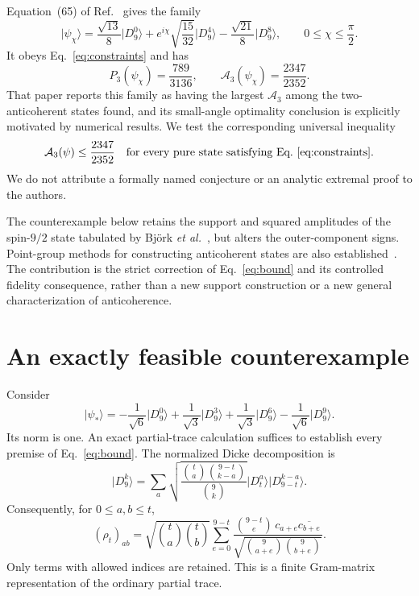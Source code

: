 \documentclass[aps,pra,reprint,onecolumn,notitlepage,longbibliography]{revtex4-2}
\newcommand{\ket}[1]{\lvert #1\rangle}
\newcommand{\A}{\mathcal A}
\begin{document}
Equation~(65) of Ref.~\cite{Martin2020} gives the family
\begin{equation}
 \ket{\psi_\chi}=\frac{\sqrt{13}}8\ket{D_9^0}
    +e^{i\chi}\sqrt{\frac{15}{32}}\ket{D_9^4}
    -\frac{\sqrt{21}}8\ket{D_9^8},
 \qquad 0\leq\chi\leq\frac\pi2.
 \label{eq:published}
\end{equation}
It obeys Eq.~\eqref{eq:constraints} and has
\begin{equation}
 P_3(\psi_\chi)=\frac{789}{3136},\qquad
 \A_3(\psi_\chi)=\frac{2347}{2352}.
 \label{eq:baseline}
\end{equation}
That paper reports this family as having the largest $\A_3$ among the two-anticoherent states found, and its small-angle optimality conclusion is explicitly motivated by numerical results. We test the corresponding universal inequality
\begin{equation}
 \A_3(\psi)\leq\frac{2347}{2352}
 \quad\text{for every pure state satisfying Eq.~\eqref{eq:constraints}}.
 \label{eq:bound}
\end{equation}
We do not attribute a formally named conjecture or an analytic extremal proof to the authors.

The counterexample below retains the support and squared amplitudes of the spin-$9/2$ state tabulated by Bj\"ork \emph{et al.}~\cite{Bjork2015}, but alters the outer-component signs. Point-group methods for constructing anticoherent states are also established~\cite{Baguette2015}. The contribution is the strict correction of Eq.~\eqref{eq:bound} and its controlled fidelity consequence, rather than a new support construction or a new general characterization of anticoherence.

\section{An exactly feasible counterexample}
Consider
\begin{equation}
 \ket{\psi_*}=-\frac1{\sqrt6}\ket{D_9^0}
 +\frac1{\sqrt3}\ket{D_9^3}
 +\frac1{\sqrt3}\ket{D_9^6}
 -\frac1{\sqrt6}\ket{D_9^9}.
 \label{eq:witness}
\end{equation}
Its norm is one. An exact partial-trace calculation suffices to establish every premise of Eq.~\eqref{eq:bound}. The normalized Dicke decomposition is
\begin{equation}
 \ket{D_9^k}=\sum_a
 \sqrt{\frac{\binom ta\binom{9-t}{k-a}}{\binom9k}}
 \ket{D_t^a}\ket{D_{9-t}^{k-a}}.
 \label{eq:schmidt}
\end{equation}
Consequently, for $0\leq a,b\leq t$,
\begin{equation}
 (\rho_t)_{ab}=\sqrt{\binom ta\binom tb}
 \sum_{e=0}^{9-t}
 \frac{\binom{9-t}{e}\,c_{a+e}\overline{c_{b+e}}}
 {\sqrt{\binom9{a+e}\binom9{b+e}}}.
 \label{eq:trace}
\end{equation}
Only terms with allowed indices are retained. This is a finite Gram-matrix representation of the ordinary partial trace.
\end{document}
